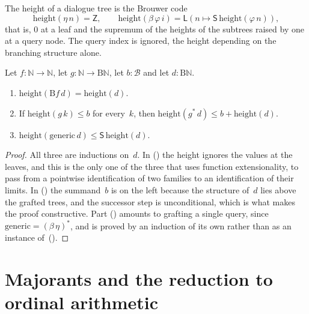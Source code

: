 \documentclass[11pt]{amsart}
\makeatletter
\newcommand{\N}{\mathbb{N}}
\newcommand{\Dial}{\mathrm{B}}
\newcommand{\height}{\mathrm{height}}
\newcommand{\kext}[1]{#1^{*}}                %
\newcommand{\Brouwer}{\mathcal{B}}
\newcommand{\bZ}{\mathsf{Z}}
\newcommand{\bS}{\mathsf{S}}
\newcommand{\bL}{\mathsf{L}}
\newcommand{\bplus}{\mathbin{+}}
\newif\ifagdarefs
\newcommand{\AgdaRefs}[1]{\ifagdarefs{\footnotesize\color{agdablue}(#1)}\else\unskip\fi}
\newcommand{\Agda}[2]{{\footnotesize\color{agdablue}\textsf{#1}%
  \ifblank{#2}{}{\texttt{.}\allowbreak\texttt{#2}}}}
\let\ttt@plain\texttt
\renewcommand{\texttt}[1]{{\footnotesize\color{agdablue}\ttt@plain{#1}}}
\theoremstyle{plain}
\theoremstyle{definition}
\makeatother
\begin{document}
\begin{definition}
\label{def:height}
The height of a dialogue tree is the Brouwer code
\[
  \height(\eta\,n) = \bZ , \qquad
  \height(\beta\,\varphi\,i) = \bL(n \mapsto \bS\,\height(\varphi\,n)) ,
\]
that is, $0$ at a leaf and the supremum of the heights of the subtrees
raised by one at a query node. The query index is ignored, the height
depending on the branching structure alone.
\AgdaRefs{\Agda{DialogueTrees.Constructive}{height}.}
\end{definition}

\begin{lemma}
\label{lem:height-three}
Let $f : \N\to\N$, let $g : \N \to \Dial\N$, let $b : \Brouwer$ and let
$d : \Dial\N$.
\begin{enumerate}
\item\label{item:relabel}
  $\height(\Dial f\,d) = \height(d)$.
\item\label{item:graft}
  If $\height(g\,k) \le b$ for every~$k$, then
  $\height(\kext g\,d) \le b \bplus \height(d)$.
\item\label{item:generic}
  $\height(\mathrm{generic}\,d) \le \bS\,\height(d)$.
\end{enumerate}
\AgdaRefs{\Agda{DialogueTrees.Constructive}{height-relabel};
\texttt{height-kleisli-extension}, \texttt{height-generic}.}
\end{lemma}

\begin{proof}
All three are inductions on~$d$. In
() the height ignores the values at the
leaves, and this is the only one of the three that uses function
extensionality, to pass from a pointwise identification of two
families to an identification of their limits.
In () the summand~$b$ is on the left because the
structure of~$d$ lies above the grafted trees, and the successor step
is unconditional, which is what makes the proof constructive. Part
() amounts to grafting a single query, since
$\mathrm{generic} = \kext{(\beta\,\eta)}$, and is proved by an
induction of its own rather than as an instance
of~().
\end{proof}

\section{Majorants and the reduction to ordinal arithmetic}
\label{sec:majorant}
\end{document}
